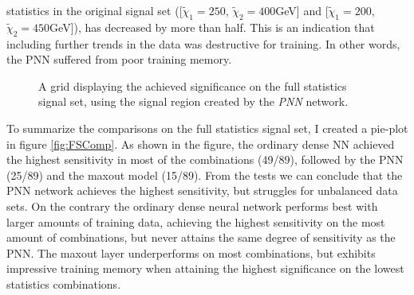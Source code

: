 statistics in the original signal set ([$\tilde{\chi}_1=250$, $\tilde{\chi}_2=400$GeV] and [$\tilde{\chi}_1=200$, $\tilde{\chi}_2=450$GeV]), has decreased by more than half.
This is an indication that including further trends in the data was destructive for training. In other words, the \ac{PNN} suffered from poor training memory.\\
\begin{figure}
    \caption{A grid displaying the achieved significance on the full statistics signal set, using the signal region 
    created by the \emph{PNN} network.}
    \label{fig:PNNPCA_FS_MLMGridSig}
\end{figure}
To summarize the comparisons on the full statistics signal set, I created a pie-plot in figure \ref{fig:FSComp}. As shown in the figure, the ordinary dense \ac{NN}
achieved the highest sensitivity in most of the combinations (49/89), followed by the \ac{PNN} (25/89) and the maxout model (15/89). From the tests we can conclude that 
the \ac{PNN} network achieves the highest sensitivity, but struggles for unbalanced data sets. On the contrary the ordinary dense neural network performs best with larger amounts of 
training data, achieving the highest sensitivity on the most amount of combinations, but never attains the same degree of sensitivity as the \ac{PNN}. The maxout layer underperforms on 
most combinations, but exhibits impressive training memory when attaining the highest significance on the lowest statistics combinations.
